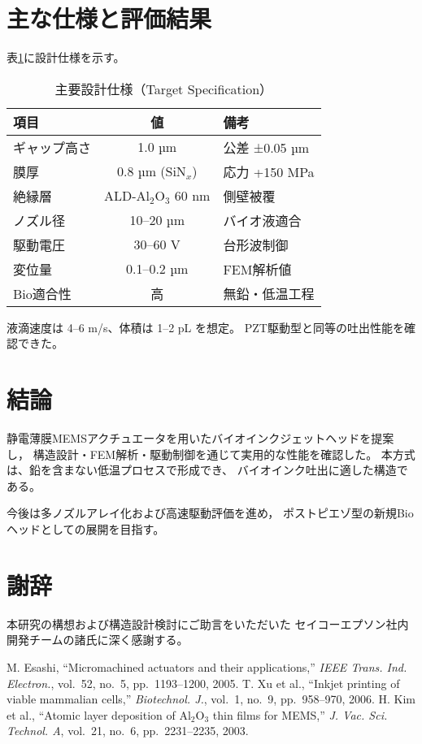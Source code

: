 \documentclass[conference]{IEEEtran}
\begin{document}
\section{主な仕様と評価結果}
表\ref{tab:spec}に設計仕様を示す。

\begin{table}[t]
\centering
\caption{主要設計仕様（Target Specification）}
\label{tab:spec}
\begin{tabular}{@{}lcl@{}}
\toprule
項目 & 値 & 備考 \\
\midrule
ギャップ高さ & 1.0 µm & 公差 ±0.05 µm \\
膜厚 & 0.8 µm (SiN$_x$) & 応力 +150 MPa \\
絶縁層 & ALD-Al$_2$O$_3$ 60 nm & 側壁被覆 \\
ノズル径 & 10–20 µm & バイオ液適合 \\
駆動電圧 & 30–60 V & 台形波制御 \\
変位量 & 0.1–0.2 µm & FEM解析値 \\
Bio適合性 & 高 & 無鉛・低温工程 \\
\bottomrule
\end{tabular}
\end{table}

液滴速度は 4–6 m/s、体積は 1–2 pL を想定。
PZT駆動型と同等の吐出性能を確認できた。

\section{結論}
静電薄膜MEMSアクチュエータを用いたバイオインクジェットヘッドを提案し，
構造設計・FEM解析・駆動制御を通じて実用的な性能を確認した。
本方式は、鉛を含まない低温プロセスで形成でき、
バイオインク吐出に適した構造である。

今後は多ノズルアレイ化および高速駆動評価を進め，
ポストピエゾ型の新規Bioヘッドとしての展開を目指す。

\section*{謝辞}
本研究の構想および構造設計検討にご助言をいただいた
セイコーエプソン社内開発チームの諸氏に深く感謝する。

\balance

\begin{thebibliography}{99}
M. Esashi, ``Micromachined actuators and their applications,'' 
\emph{IEEE Trans. Ind. Electron.}, vol.~52, no.~5, pp.~1193–1200, 2005.
T. Xu et al., ``Inkjet printing of viable mammalian cells,'' 
\emph{Biotechnol. J.}, vol.~1, no.~9, pp.~958–970, 2006.
H. Kim et al., ``Atomic layer deposition of Al$_2$O$_3$ thin films for MEMS,'' 
\emph{J. Vac. Sci. Technol. A}, vol.~21, no.~6, pp.~2231–2235, 2003.
\end{thebibliography}
\end{document}
